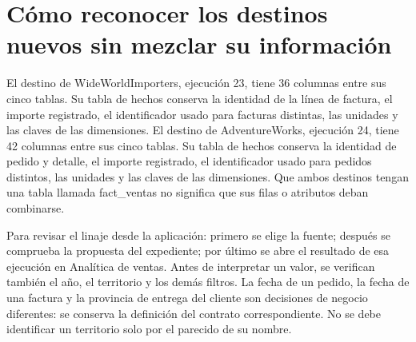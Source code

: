 \section{Cómo reconocer los destinos nuevos sin mezclar su información}
El destino de WideWorldImporters, ejecución 23, tiene 36 columnas entre sus cinco tablas. Su tabla de hechos conserva la identidad de la línea de factura, el importe registrado, el identificador usado para facturas distintas, las unidades y las claves de las dimensiones. El destino de AdventureWorks, ejecución 24, tiene 42 columnas entre sus cinco tablas. Su tabla de hechos conserva la identidad de pedido y detalle, el importe registrado, el identificador usado para pedidos distintos, las unidades y las claves de las dimensiones. Que ambos destinos tengan una tabla llamada fact\_\allowbreak{}ventas no significa que sus filas o atributos deban combinarse.

Para revisar el linaje desde la aplicación: primero se elige la fuente; después se comprueba la propuesta del expediente; por último se abre el resultado de esa ejecución en Analítica de ventas. Antes de interpretar un valor, se verifican también el año, el territorio y los demás filtros. La fecha de un pedido, la fecha de una factura y la provincia de entrega del cliente son decisiones de negocio diferentes: se conserva la definición del contrato correspondiente. No se debe identificar un territorio solo por el parecido de su nombre.

